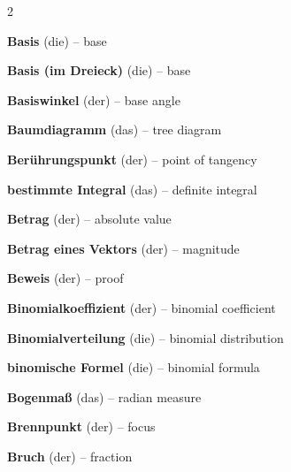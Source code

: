 \begin{multicols}{2}
\par\nopagebreak
\textbf{Basis} (die) -- base\dotfill\hyperref[e:43]{\pageref*{e:43}}\par
\textbf{Basis (im Dreieck)} (die) -- base\dotfill\hyperref[e:183]{\pageref*{e:183}}\par
\textbf{Basiswinkel} (der) -- base angle\dotfill\hyperref[e:184]{\pageref*{e:184}}\par
\textbf{Baumdiagramm} (das) -- tree diagram\dotfill\hyperref[e:332]{\pageref*{e:332}}\par
\textbf{Berührungspunkt} (der) -- point of tangency\dotfill\hyperref[e:220]{\pageref*{e:220}}\par
\textbf{bestimmte Integral} (das) -- definite integral\dotfill\hyperref[e:288]{\pageref*{e:288}}\par
\textbf{Betrag} (der) -- absolute value\dotfill\hyperref[e:53]{\pageref*{e:53}}\par
\textbf{Betrag eines Vektors} (der) -- magnitude\dotfill\hyperref[e:305]{\pageref*{e:305}}\par
\textbf{Beweis} (der) -- proof\dotfill\hyperref[e:349]{\pageref*{e:349}}\par
\textbf{Binomialkoeffizient} (der) -- binomial coefficient\dotfill\hyperref[e:344]{\pageref*{e:344}}\par
\textbf{Binomialverteilung} (die) -- binomial distribution\dotfill\hyperref[e:345]{\pageref*{e:345}}\par
\textbf{binomische Formel} (die) -- binomial formula\dotfill\hyperref[e:93]{\pageref*{e:93}}\par
\textbf{Bogenmaß} (das) -- radian measure\dotfill\hyperref[e:139]{\pageref*{e:139}}\par
\textbf{Brennpunkt} (der) -- focus\dotfill\hyperref[e:316]{\pageref*{e:316}}\par
\textbf{Bruch} (der) -- fraction\dotfill\hyperref[e:28]{\pageref*{e:28}}\par


\end{multicols}
